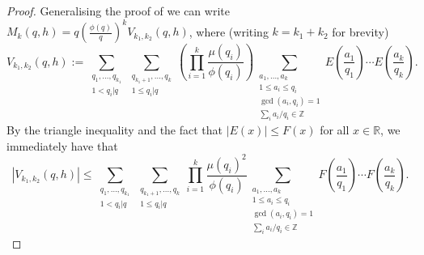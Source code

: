 \documentclass[11pt,letterpaper]{amsart}
\newcommand{\subsum}[1]{\sum_{\substack{#1}}}
\newcommand{\ogcd}[2]{\gcd(#1,#2)}
\theoremstyle{definition}
\begin{document}
\begin{proof}
Generalising the proof of \cite[Lemma 2]{MV86} we can write $M_k(q,h) =  q(\frac{\phi(q)}{q})^k V_{k_1,k_2}(q,h)$, where (writing $k=k_1+k_2$ for brevity)
\begin{equation*}
V_{k_1,k_2}(q,h) := \subsum{q_1, \dots, q_{k_1} \\ 1 < q_i|q} \subsum{q_{k_1+1}, \dots, q_{k} \\ 1 \leq q_i|q} \left(\prod_{i=1}^k \frac{\mu(q_i)}{\phi(q_i)}\right)\subsum{a_1, \dots, a_k \\ 1 \le a_i \le q_i \\ \ogcd{a_i}{q_i} = 1 \\ \sum_i a_i/q_i \in \mathbb Z} E\left(\frac{a_1}{q_1}\right) \cdots E\left(\frac{a_k}{q_k}\right).
\end{equation*}
By the triangle inequality and the fact that $|E(x)| \le F(x)$ for all $x \in \mathbb R$, we immediately have that
\begin{equation*}
|V_{k_1,k_2}(q,h)| \le \subsum{q_1, \dots, q_{k_1} \\ 1 < q_i|q} \subsum{q_{k_1+1}, \dots, q_{k} \\ 1 \leq q_i|q} \prod_{i=1}^k \frac{\mu(q_i)^2}{\phi(q_i)}\subsum{a_1, \dots, a_k \\ 1 \le a_i \le q_i \\ \ogcd{a_i}{q_i} = 1 \\ \sum_i a_i/q_i \in \mathbb Z} F\left(\frac{a_1}{q_1}\right) \cdots F\left(\frac{a_k}{q_k}\right).
\end{equation*}


\end{proof}
\end{document}
